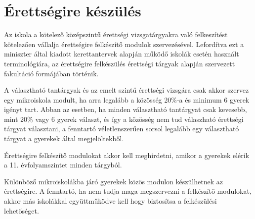 \section{Érettségire készülés}
\label{sec:erettsegi}

Az iskola a kötelező középszintű érettségi vizsgatárgyakra való
felkeszítést kötelezően vállalja érettségire felkészítő modulok
szervezésével. Lefordítva ezt a miniszter által kiadott kerettantervek alapján
működő iskolák esetén használt terminológiára, az érettségire felkészülés
érettségi tárgyak alapján szervezett fakultáció formájában történik.

A választható tantárgyak és az emelt szintű érettségi vizsgára csak akkor
szervez egy mikroiskola modult, ha arra legalább a közösség 20\%-a és minimum 6
gyerek igényt tart. Abban az esetben, ha minden választható tantárgyat csak
kevesebb, 
mint 20\% vagy 6 gyerek választ, és így a közösség nem tud válaszható érettségi
tárgyat választani, a fenntartó véletlenszerűen sorsol legalább egy választható
tárgyat
a gyerekek által megjelöltekből.

Érettségire felkészítő modulokat akkor kell meghirdetni, amikor a gyerekek
elérik a 11. évfolyamszintet minden tárgyból.

Különböző mikroiskolákba járó gyerekek közös modulon készülhetnek az
érettségire. A fenntartó, ha nem tudja maga megszervezni a felkészítő modulokat, akkor más iskolákkal
együttműködve kell hogy biztosítsa a felkészülési lehetőséget.